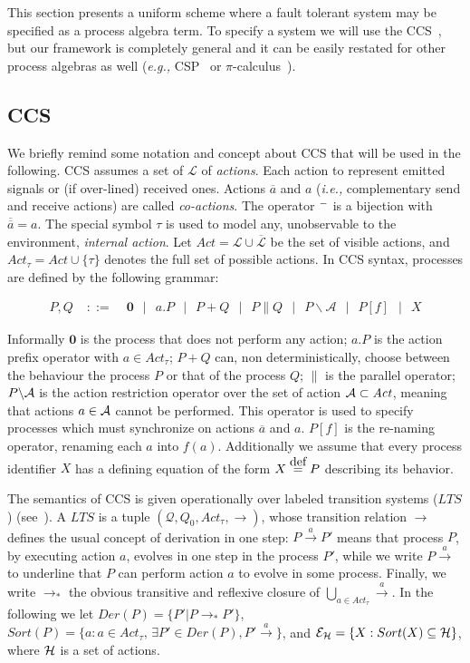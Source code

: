 \documentclass{entcs}
\newcommand{\eg}{\emph{e.g., }}
\newcommand{\ie}{\emph{i.e., }}
\newcommand{\lts}{\mathit{LTS}}
\newcommand{\mmid}{\ \ \mid \ \ }
\newcommand{\ar}        {\longrightarrow}
\newcommand{\trans}[1]{\stackrel{#1}{\ar}}
\newcommand{\env}[1]{\mathcal{E}_{#1}}
\newcommand{\Lab}{\mathcal {L}}
\newcommand{\Act}{\mathit {Act}}
\newcommand{\Acttau}{\mathit {Act}_\tau}
\newcommand{\eqdef}{\stackrel{\mbox{{\tiny def}}}{=}}
\newcommand{\inp}[1]{{#1}}
\newcommand{\out}[1]{\overline{#1}}
\newcommand{\res}{\backslash}
\renewcommand{\stop}{\mathbf{0}}
\newcommand{\ltsQ}{\mathcal{Q}}
\newcommand{\ltsq}{Q}
\begin{document}
This section presents a uniform scheme where a fault tolerant system may be
specified as a process algebra term. To specify a system we will use the
CCS~\cite{M89}, but our framework is completely general and it can be easily
restated for other process algebras as well (\eg CSP~\cite{Hoare85} or
$\pi$-calculus~\cite{milner:92a}).

\subsection{CCS}
We briefly remind some notation and concept about CCS that will be used in the
following. CCS assumes a set of $\Lab$ of \emph{actions}.  Each action to
represent emitted signals or (if over-lined) received ones.  Actions $\out{a}$
and $\inp{a}$ (\ie complementary send and receive actions) are called
\emph{co-actions}. The operator $\space^-$ is a bijection with
$\overline{\overline{a}} = a$. The special symbol $\tau$ is used to model any,
unobservable to the environment, \emph{internal action}.  Let $\Act =
\inp{\Lab} \cup \out{\Lab}$ be the set of visible actions, and $\Acttau = \Act
\cup \{\tau\}$ denotes the full set of possible actions.  In CCS syntax,
processes are defined by the following grammar:%

\begin{eqnarray*}
P, Q \; & ::= & \; \stop \mmid a.P \mmid P + Q \mmid P
\parallel Q \mmid P \res \mathcal{A} \mmid P[f] \mmid X
\end{eqnarray*}%

Informally $\stop$ is the process that does not perform any action; $a.P$ is
the action prefix operator with $a\in\Acttau$; $P + Q$ can, non
deterministically, choose between the behaviour the process $P$ or that of the
process $Q$; $\parallel$ is the parallel operator; $P \res {\cal A}$ is the
action restriction operator over the set of action ${\cal A} \subset \Act$,
meaning that actions $a \in{\cal A}$ cannot be performed. This operator is
used to specify processes which must synchronize on actions $\out{a}$ and
$\inp{a}$. $P[f]$ is the re-naming operator, renaming each $a$ into $f(a)$.
Additionally we assume that every process identifier $X$ has a defining
equation of the form $X \eqdef P$ describing its behavior.

The semantics of CCS is given operationally over labeled transition systems
($\lts$) (see~\cite{M89}). A $\lts$ is a tuple $(\ltsQ, \ltsq_0, Act_\tau,
\trans{})$, whose transition relation $\trans{}$ defines the usual concept of
derivation in one step: $P \trans{a} P'$ means that process $P$, by executing
action $a$, evolves in one step in the process $P'$, while we write $P
\trans{a}$ to underline that $P$ can perform action $a$ to evolve in some
process. Finally, we write $\trans{}_{*}$ the obvious transitive and reflexive
closure of $\bigcup_{a \in \Acttau}\trans{a}$.  In the following we let
$Der(P)=\{P'| P \trans{}_{*} P'\}$, $Sort(P)=\{a: a \in \Acttau, \, \exists P'
\in Der(P), P' \trans{a}\}$, and $\env{\cal H}=\{X: Sort(X)\subseteq {\cal H}
\}$, where ${\cal H}$ is a set of actions.
\end{document}
